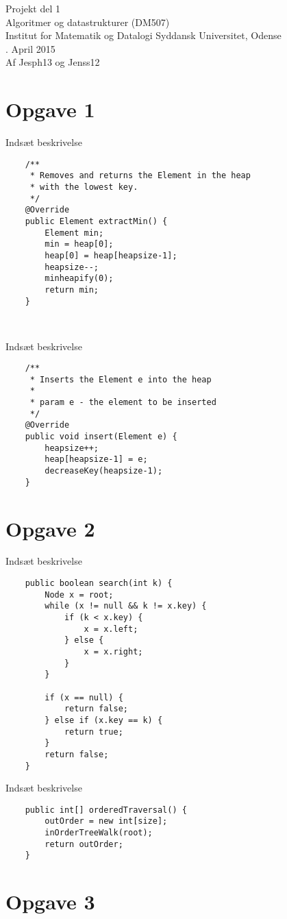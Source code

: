 \documentclass{article}
\begin{document}
{\centering 
\huge
Projekt del 1\\
Algoritmer og datastrukturer (DM507)\\
\large
\bigskip
Institut for Matematik og Datalogi Syddansk Universitet, Odense\\
. April 2015\\
\bigskip
Af Jesph13 og Jenss12\\
}
\newpage
\section*{Opgave 1}
Indsæt beskrivelse
\begin{lstlisting}
	/**
     * Removes and returns the Element in the heap
     * with the lowest key.
     */
    @Override
    public Element extractMin() {
        Element min;
        min = heap[0];
        heap[0] = heap[heapsize-1];
        heapsize--;
        minheapify(0);
        return min;
    }
    
    
\end{lstlisting}
Indsæt beskrivelse
\begin{lstlisting}
	/**
     * Inserts the Element e into the heap
     *
     * param e - the element to be inserted
     */
    @Override
    public void insert(Element e) {
        heapsize++;
        heap[heapsize-1] = e;
        decreaseKey(heapsize-1);
    }
\end{lstlisting}
\newpage
\section*{Opgave 2}
Indsæt beskrivelse
\begin{lstlisting}
	public boolean search(int k) {
        Node x = root;
        while (x != null && k != x.key) {
            if (k < x.key) {
                x = x.left;
            } else {
                x = x.right;
            }
        }

        if (x == null) {
            return false;
        } else if (x.key == k) {
            return true;
        }
        return false;
    }
\end{lstlisting}
Indsæt beskrivelse
\begin{lstlisting}
	public int[] orderedTraversal() {
        outOrder = new int[size];
        inOrderTreeWalk(root);
        return outOrder;
    }
\end{lstlisting}
\newpage
\section*{Opgave 3}
\end{document}
